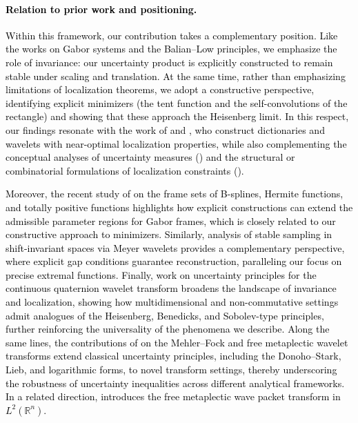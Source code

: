 \documentclass[preprint,hidelinks,authoryear]{elsarticle}
\theoremstyle{plain}
\theoremstyle{definition}
\theoremstyle{remark}
\begin{document}
\textcolor{black}{\paragraph*{Relation to prior work and positioning.}
Within this framework, our contribution takes a complementary position. Like the works on Gabor systems and the Balian–Low principles, we emphasize the role of invariance: our uncertainty product is explicitly constructed to remain stable under scaling and translation. At the same time, rather than emphasizing limitations of localization theorems, we adopt a constructive perspective, identifying explicit minimizers (the tent function and the self-convolutions of the rectangle) and showing that these approach the Heisenberg limit. In this respect, our findings resonate with the work of \cite{rivero2023solution, lebedeva2017inequality} and \cite{goh2000uncertainty}, who construct dictionaries and wavelets with near-optimal localization properties, while also complementing the conceptual analyses of uncertainty measures (\cite{breitenberger1985uncertainty}) and the structural or combinatorial formulations of localization constraints (\cite{caragea2023balian, enstad2020balian, aldahleh2025additive}).}


\textcolor{black}{Moreover, the recent study of \cite{ghosh2025gabor} on the frame sets of B-splines, Hermite functions, and totally positive functions highlights how explicit constructions can extend the admissible parameter regions for Gabor frames, which is closely related to our constructive approach to minimizers. Similarly, \cite{selvan2017optimal} analysis of stable sampling in shift-invariant spaces via Meyer wavelets provides a complementary perspective, where explicit gap conditions guarantee reconstruction, paralleling our focus on precise extremal functions. Finally, \cite{wang2024benedicks} work on uncertainty principles for the continuous quaternion wavelet transform broadens the landscape of invariance and localization, showing how multidimensional and non-commutative settings admit analogues of the Heisenberg, Benedicks, and Sobolev-type principles, further reinforcing the universality of the phenomena we describe. Along the same lines, the contributions of \cite{dades2024heisenberg, dades2025new} on the Mehler–Fock and free metaplectic wavelet transforms extend classical uncertainty principles, including the Donoho–Stark, Lieb, and logarithmic forms, to novel transform settings, thereby underscoring the robustness of uncertainty inequalities across different analytical frameworks. In a related direction, \cite{dar2024n} introduces the free metaplectic wave packet transform in $L^2(\mathbb{R}^n)$.
}
\end{document}
